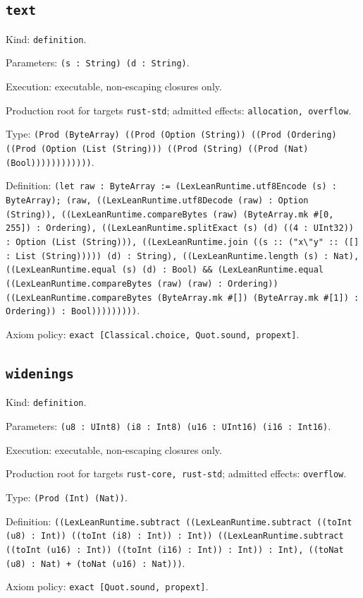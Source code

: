 \documentclass[11pt]{article}
\begin{document}
\subsection*{\texttt{text}}
\noindent Kind: \texttt{definition}.\par
\noindent Parameters: \texttt{(s : String) (d : String)}.\par
\noindent Execution: executable, non-escaping closures only.\par
\noindent Production root for targets \texttt{rust-std}; admitted effects: \texttt{allocation, overflow}.\par
\noindent Type: \texttt{(Prod (ByteArray) ((Prod (Option (String)) ((Prod (Ordering) ((Prod (Option (List (String))) ((Prod (String) ((Prod (Nat) (Bool))))))))))))}.\par
\noindent Definition: \texttt{(let raw : ByteArray := (LexLeanRuntime.utf8Encode (s) : ByteArray); (raw, ((LexLeanRuntime.utf8Decode (raw) : Option (String)), ((LexLeanRuntime.compareBytes (raw) (ByteArray.mk \#[0, 255]) : Ordering), ((LexLeanRuntime.splitExact (s) (d) ((4 : UInt32)) : Option (List (String))), ((LexLeanRuntime.join ((s :: ("x\textbackslash{}"y" :: ([] : List (String))))) (d) : String), ((LexLeanRuntime.length (s) : Nat), ((LexLeanRuntime.equal (s) (d) : Bool) \&\& (LexLeanRuntime.equal ((LexLeanRuntime.compareBytes (raw) (raw) : Ordering)) ((LexLeanRuntime.compareBytes (ByteArray.mk \#[]) (ByteArray.mk \#[1]) : Ordering)) : Bool)))))))))}.\par
\noindent Axiom policy: \texttt{exact [Classical.choice, Quot.sound, propext]}.\par
\subsection*{\texttt{widenings}}
\noindent Kind: \texttt{definition}.\par
\noindent Parameters: \texttt{(u8 : UInt8) (i8 : Int8) (u16 : UInt16) (i16 : Int16)}.\par
\noindent Execution: executable, non-escaping closures only.\par
\noindent Production root for targets \texttt{rust-core, rust-std}; admitted effects: \texttt{overflow}.\par
\noindent Type: \texttt{(Prod (Int) (Nat))}.\par
\noindent Definition: \texttt{((LexLeanRuntime.subtract ((LexLeanRuntime.subtract ((toInt (u8) : Int)) ((toInt (i8) : Int)) : Int)) ((LexLeanRuntime.subtract ((toInt (u16) : Int)) ((toInt (i16) : Int)) : Int)) : Int), ((toNat (u8) : Nat) + (toNat (u16) : Nat)))}.\par
\noindent Axiom policy: \texttt{exact [Quot.sound, propext]}.\par
\end{document}
